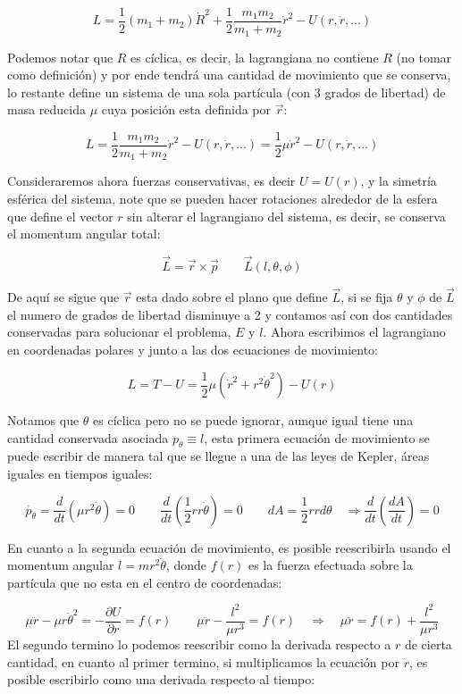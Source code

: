 	\[
	L=\frac{1}{2}(m_1+m_2)\dot{R}^{2}+\frac{1}{2}\frac{m_1m_2}{m_1+m_2}\dot{r}^2-U(r,\dot{r},...)
	\]
	
	Podemos notar que $R$ es cíclica, es decir, la lagrangiana no contiene $R$ (no tomar como definición) y por ende tendrá una cantidad de movimiento que se conserva, lo restante define un sistema de una sola partícula (con 3 grados de libertad) de masa reducida $\mu$ cuya posición esta definida por $\vec{r}$:
	
	\[
	L=\frac{1}{2}\frac{m_1m_2}{m_1+m_2}\dot{r}^2-U(r,\dot{r},...)=\frac{1}{2}\mu\dot{r}^2-U(r,\dot{r},...)
	\]
	
	Consideraremos ahora fuerzas conservativas, es decir $U=U(r)$, y la simetría esférica del sistema, note que se pueden hacer rotaciones alrededor de la esfera que define el vector $r$ sin alterar el lagrangiano del sistema, es decir, se conserva el momentum angular total:
	
	\[
	\vec{L}=\vec{r}\times\vec{p}\quad\quad \vec{L}(l,\theta,\phi)
	\]
	
	De aquí se sigue que $\vec{r}$ esta dado sobre el plano que define $\vec{L}$, si se fija $\theta$ y $\phi$ de $\vec{L}$ el numero de grados de libertad disminuye a 2 y contamos así con dos cantidades conservadas para solucionar el problema, $E$ y $l$. Ahora escribimos el lagrangiano en coordenadas polares y junto a las dos ecuaciones de movimiento:
	
	\[
	L=T-U=\frac{1}{2}\mu(\dot{r}^2+r^2\dot{\theta}^2)-U(r)
	\]
	
	Notamos que $\theta$ es cíclica pero no se puede ignorar, aunque igual tiene una cantidad conservada asociada $p_\theta\equiv l$, esta primera ecuación de movimiento se puede escribir de manera tal que se llegue a una de las leyes de Kepler, áreas iguales en tiempos iguales:
	
	\[
	\dot{p_\theta}=\frac{d}{dt}\left(\mu r^2\dot{\theta}\right)=0\quad\quad\frac{d}{dt}\left(\frac{1}{2}rr\dot{\theta}\right)=0\quad\quad dA=\frac{1}{2}rrd\theta\quad\Longrightarrow\frac{d}{dt}\left(\frac{dA}{dt}\right)=0
	\]
	
	En cuanto a la segunda ecuación de movimiento, es posible reescribirla usando el momentum angular $l=mr^2\dot{\theta}$, donde $f(r)$ es la fuerza efectuada sobre la partícula que no esta en el centro de coordenadas:
	
	\[
	\mu\ddot{r}-\mu r\dot{\theta}^2=-\frac{\partial U}{\partial r}=f(r)\quad\quad\mu\ddot{r}-\frac{l^2}{\mu r^3}=f(r)\quad\Longrightarrow\quad\mu\ddot{r}=f(r)+\frac{l^2}{\mu r^3}
	\]  
	El segundo termino lo podemos reescribir como la derivada respecto a $r$ de cierta cantidad, en cuanto al primer termino, si multiplicamos la ecuación por $\dot{r}$, es posible escribirlo como una derivada respecto al tiempo:
	

